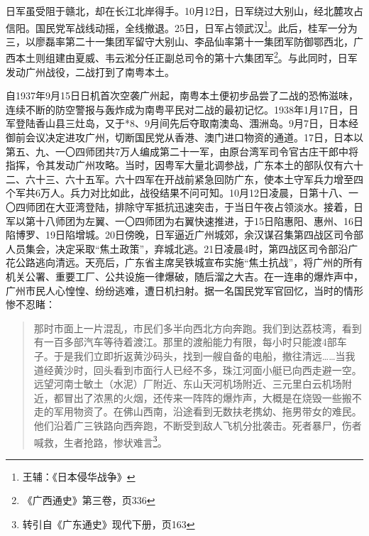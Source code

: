 日军虽受阻于赣北，却在长江北岸得手。10月12日，日军绕过大别山，经北麓攻占信阳。国民党军战线动摇，全线撤退。25日，日军占领武汉\footnote{王辅：《日本侵华战争》}。此后，桂军一分为三，以廖磊率第二十一集团军留守大别山、李品仙率第十一集团军防御鄂西北，广西本土则组建由夏威、韦云淞分任正副总司令的第十六集团军\footnote{《广西通史》第三卷，页336}。与此同时，日军发动广州战役，二战打到了南粤本土。

自1937年9月15日日机首次空袭广州起，南粤本土便初步品尝了二战的恐怖滋味，连续不断的防空警报与轰炸成为南粤平民对二战的最初记忆。1938年1月17日，日军登陆香山县三灶岛，又于*8、9月间先后夺取南澳岛、涠洲岛。9月7日，日本经御前会议决定进攻广州，切断国民党从香港、澳门进口物资的通道。17日，日本以第五、九、一〇四师团共7万人编成第二十一军，由原台湾军司令官古庄干郎中将指挥，令其发动广州攻略。当时，因粤军大量北调参战，广东本土的部队仅有六十二、六十三、六十五军。六十四军在开战前紧急回防广东，使本土守军兵力增至四个军共6万人。兵力对比如此，战役结果不问可知。10月12日凌晨，日第十八、一〇四师团在大亚湾登陆，排除守军抵抗迅速突击，于当日午夜占领淡水。接着，日军以第十八师团为左翼、一〇四师团为右翼快速推进，于15日陷惠阳、惠州、16日陷博罗、19日陷增城。20日傍晚，日军逼近广州城郊，余汉谋召集第四战区司令部人员集会，决定采取“焦土政策”，弃城北逃。21日凌晨4时，第四战区司令部沿广花公路逃向清远。天亮后，广东省主席吴铁城宣布实施“焦土抗战”，将广州的所有机关公署、重要工厂、公共设施一律爆破，随后溜之大吉。在一连串的爆炸声中，广州市民人心惶惶、纷纷逃难，遭日机扫射。据一名国民党军官回忆，当时的情形惨不忍睹：

\begin{quote}

那时市面上一片混乱，市民们多半向西北方向奔跑。我们到达荔枝湾，看到有一百多部汽车等待着渡江。那里的渡船能力有限，每小时只能渡4部车子。于是我们立即折返黄沙码头，找到一艘自备的电船，撤往清远……当我道经黄沙时，回头看到市面行人已经不多，珠江河面小艇已向西走避一空。远望河南士敏土（水泥）厂附近、东山天河机场附近、三元里白云机场附近，都冒出了浓黑的火烟，还传来一阵阵的爆炸声，大概是在烧毁一些搬不走的军用物资了。在佛山西南，沿途看到无数扶老携幼、拖男带女的难民。他们沿着广三铁路向西奔跑，不断受到敌人飞机分批袭击。死者暴尸，伤者喊救，生者抢路，惨状难言\footnote{转引自《广东通史》现代下册，页163}。

\end{quote}

